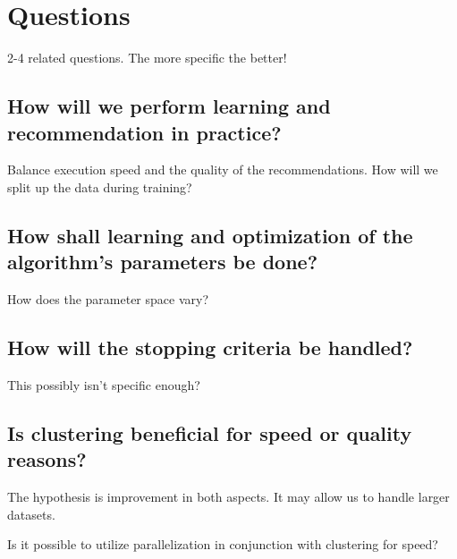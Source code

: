 
\section{Questions}\label{sec:intro:questions}

2-4 related questions. The more specific the better!

\subsection*{How will we perform learning and recommendation in practice?}

Balance execution speed and the quality of the recommendations. How will we split up the data during training?

\subsection*{How shall learning and optimization of the algorithm's parameters be done?}

How does the parameter space vary?

\subsection*{How will the stopping criteria be handled?}

This possibly isn't specific enough?

\subsection*{Is clustering beneficial for speed or quality reasons?}

The hypothesis is improvement in both aspects. It may allow us to handle larger datasets.

Is it possible to utilize parallelization in conjunction with clustering for speed?
